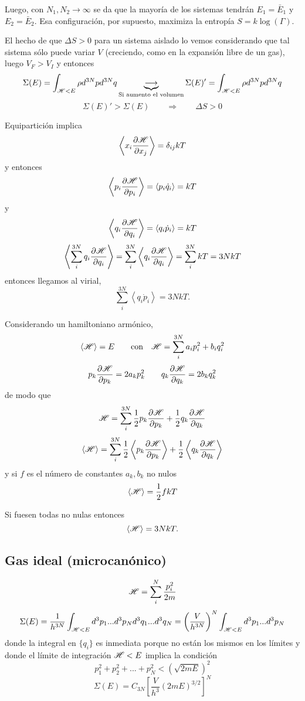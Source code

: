\documentclass[10pt,oneside]{CBFT_book}
\begin{document}
Luego, con $N_1, N_2 \to \infty$ se da que la mayoría de los sistemas tendrán $E_1=\bar{E}_1$ y $E_2=\bar{E}_2$.
Esa configuración, por supuesto, maximiza la entropía $S=k\log(\Gamma)$.

El hecho de que $\Delta S> 0$ para un sistema aislado lo vemos considerando que tal sistema sólo puede variar
$V$ (creciendo, como en la expansión libre de un gas), luego $V_F > V_I$ y entonces
\[
	\Sigma(E) = \int_{\mathscr{H} < E} \rho d^{3N}p d^{3N}q \underbrace{\longrightarrow}_{\text{Si aumento el volumen}}
	\Sigma(E)' = \int_{\mathscr{H} < E} \rho d^{3N}p d^{3N}q
\]
\[
	\Sigma(E)' > \Sigma(E) \qquad \Rightarrow \qquad \Delta S > 0
\]

Equipartición implica 
\[
	\left< x_i \frac{\partial^{\hspace{-0.05em}} {\mathscr{H}}}{\partial {x_j}^{\hspace{-0.05em}}} \right> = \delta_{ij} k T
\]
y entonces
\[
	\left< p_i \frac{\partial^{\hspace{-0.05em}} {\mathscr{H}}}{\partial {p_i}^{\hspace{-0.05em}}} \right> = \left< p_i \dot{q}_i \right> = kT 
\]
y
\[
	\left< q_i \frac{\partial^{\hspace{-0.05em}} {\mathscr{H}}}{\partial {q_i}^{\hspace{-0.05em}}} \right> = \left< q_i \dot{p}_i \right> = kT 
\]
\[
	\left< \sum_i^{3N} q_i \frac{\partial^{\hspace{-0.05em}} {\mathscr{H}}}{\partial {q_i}^{\hspace{-0.05em}}} \right> =  \sum_i^{3N} \left< q_i \frac{\partial^{\hspace{-0.05em}} {\mathscr{H}}}{\partial {q_i}^{\hspace{-0.05em}}} \right> =
	\sum_i^{3N} k T = 3 N k T
\]
entonces llegamos al virial,
\[
	\sum_i^{3N} \left< q_i \dot{p}_i \right> = 3 N k T.
\]

Considerando un hamiltoniano armónico,
\[
	\left< \mathscr{H} \right> = E \qquad \text{con} \quad \mathscr{H} = \sum_i^{3N} a_i p_i^2 + b_i q_i^2
\]
\[
	p_k \frac{\partial^{\hspace{-0.05em}} {\mathscr{H}}}{\partial {p_k}^{\hspace{-0.05em}}} = 2 a_k p_k^2 \qquad q_k \frac{\partial^{\hspace{-0.05em}} {\mathscr{H}}}{\partial {q_k}^{\hspace{-0.05em}}} = 2 b_k q_k^2
\]
de modo que 
\[
	\mathscr{H} =  \sum_i^{3N} \frac{1}{2} p_k \frac{\partial^{\hspace{-0.05em}} {\mathscr{H}}}{\partial {p_k}^{\hspace{-0.05em}}} + \frac{1}{2} q_k \frac{\partial^{\hspace{-0.05em}} {\mathscr{H}}}{\partial {q_k}^{\hspace{-0.05em}}}
\]
\[
	\left< \mathscr{H} \right> =  \sum_i^{3N} \frac{1}{2} \left< p_k \frac{\partial^{\hspace{-0.05em}} {\mathscr{H}}}{\partial {p_k}^{\hspace{-0.05em}}}\right> +
		\frac{1}{2} \left< q_k \frac{\partial^{\hspace{-0.05em}} {\mathscr{H}}}{\partial {q_k}^{\hspace{-0.05em}}} \right>
\]
y si $f$ es el número de constantes $a_k,b_k$ no nulos
\[
	\left< \mathscr{H} \right> =  \frac{1}{2} f k T
\]

Si fuesen todas no nulas entonces
\[
	\left< \mathscr{H} \right>  = 3 N k T.
\]

\subsection{Gas ideal (microcanónico)}

\[
	\mathscr{H} =  \sum_i^{N} \frac{p^2_i}{2m}
\]
\[
	\Sigma(E) = \frac{1}{h^{3N}} \int_{\mathscr{H} < E} d^3p_1 ... d^3p_N d^3q_1 ... d^3q_N = 
	\left( \frac{V}{h^{3N}} \right)^N \int_{\mathscr{H} < E} d^3p_1 ... d^3p_N
\]
donde la integral en $\{ q_i\}$ es inmediata porque no están los mismos en los límites y donde el
límite de integración $\mathscr{H} < E$ implica la condición 
\[
	p_1^2 + p_2^2 + ... + p_N^2 < ( \sqrt{2mE} )^2
\]
\[
	\Sigma(E) = C_{3N} \left[ \frac{V}{h^3} (2mE)^{3/2}\right]^N
\]

\end{document}
